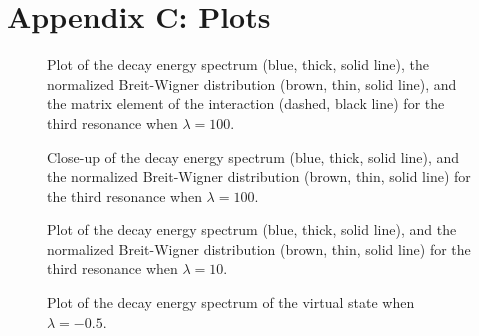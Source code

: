 \documentclass[12pt]{article}
\begin{document}
\section{Appendix C: Plots}
\setcounter{equation}{0}
\label{app:plots}



\begin{figure}[h!]
\begin{center}
              \epsfxsize=11cm
\end{center}                
\caption{Plot of the decay energy spectrum (blue, thick, solid line), 
the normalized Breit-Wigner distribution (brown, thin, solid line), and the 
matrix element of the interaction (dashed, black line)
for the third resonance when $\lambda =100$.}
\label{fig:thirdthree100}
\end{figure} 




\begin{figure}[h!]
\begin{center}
              \epsfxsize=11cm
\end{center}                
\caption{Close-up of the decay energy spectrum (blue, thick, solid line), 
and the normalized Breit-Wigner distribution (brown, thin, solid line) 
for the third resonance when $\lambda =100$.}
\label{fig:thirdtwo100}
\end{figure} 





\begin{figure}[h!]
\begin{center}
              \epsfxsize=11cm
\end{center}                
\caption{Plot of the decay energy spectrum (blue, thick, solid line), and 
the normalized Breit-Wigner distribution (brown, thin, solid line) for 
the third resonance when $\lambda =10$.}
\label{fig:thirdtwo10}
\end{figure} 


\quad

\vskip2cm


\begin{figure}[H]
\begin{center}
              \epsfxsize=11cm
\end{center}                
\caption{Plot of the decay energy spectrum of the virtual state 
when $\lambda =-0.5$.}
\label{fig:esdvirtual}
          \end{figure} 
\end{document}
